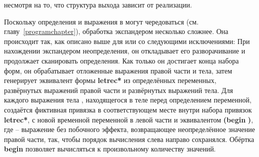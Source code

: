несмотря на то, что структура выхода зависит от реализации.\vspace{2.4mm}

Поскольку определения и выражения в  могут чередоваться
(см. главу~\ref{programchapter}), обработка экспандером  несколько
сложнее. Она происходит так, как описано выше для  или  со
следующими исключениями: При нахождении экспандером неопределения, он откладывает его
разворачивание и продолжает сканировать определения. Как только он достигает конца набора форм,
он обрабатывает отложенные выражения правой части и тела, затем генерирует эквивалент формы
{\cf\bfseries letrec*} из определённых переменных, развёрнутых выражений правой части и
развёрнутых выражений тела. Для каждого выражения тела , находящегося в теле
перед определением переменной, создаётся фиктивная привязка в соответствующем месте внутри
набора привязок {\cf\bfseries letrec*}, с новой временной переменной в левой части и
эквивалентом {\cf \textbf{(begin}  \textbf{)}}, где
 -- выражение без побочного эффекта, возвращающее неопределённое значение
правой части, так, чтобы порядок вычисления слева направо сохранялся. Обёртка {\cf\bfseries
  begin} позволяет  вычисляться к произвольному количеству значений.

